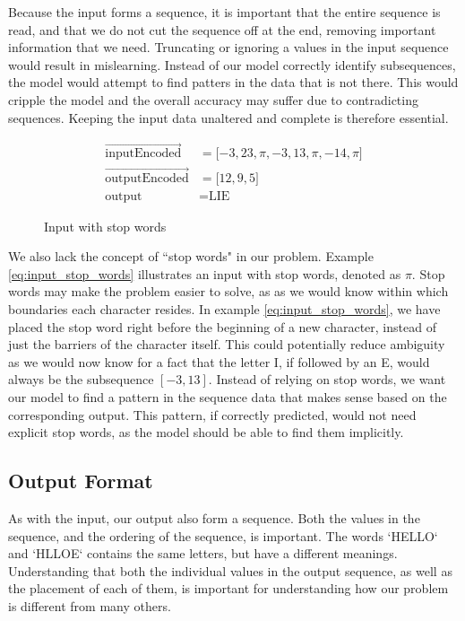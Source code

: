 Because the input forms a sequence, it is important that the entire sequence is read, and that we do not cut the sequence off at the end, removing important information that we need. Truncating or ignoring a values in the input sequence would result in mislearning. Instead of our model correctly identify subsequences, the model would attempt to find patters in the data that is not there. This would cripple the model and the overall accuracy may suffer due to contradicting sequences. Keeping the input data unaltered and complete is therefore essential.

\begin{figure}[h]
    \begin{equation}
        \label{eq:input_stop_words}
        \begin{aligned}
           \vec{\text{inputEncoded}}                &= \lbrack -3, 23, \pi, -3, 13, \pi, -14, \pi \rbrack \\
           \vec{\text{outputEncoded}}               &= \lbrack 12, 9, 5 \rbrack \\
           \text{output}                            &= \text{LIE}
        \end{aligned}
    \end{equation}
    \captionsetup{labelformat=empty}
    \caption{Input with stop words}
\end{figure}

We also lack the concept of ``stop words" in our problem. Example \ref{eq:input_stop_words} illustrates an input with stop words, denoted as $\pi$. Stop words may make the problem easier to solve, as as we would know within which boundaries each character resides. In example \ref{eq:input_stop_words}, we have placed the stop word right before the beginning of a new character, instead of just the barriers of the character itself. This could potentially reduce ambiguity as we would now know for a fact that the letter I, if followed by an E, would always be the subsequence \([-3, 13]\). Instead of relying on stop words, we want our model to find a pattern in the sequence data that makes sense based on the corresponding output. This pattern, if correctly predicted, would not need explicit stop words, as the model should be able to find them implicitly.

\subsection{Output Format}
As with the input, our output also form a sequence. Both the values in the sequence, and the ordering of the sequence, is important. The words `HELLO` and `HLLOE` contains the same letters, but have a different meanings. Understanding that both the individual values in the output sequence, as well as the placement of each of them, is important for understanding how our problem is different from many others.

